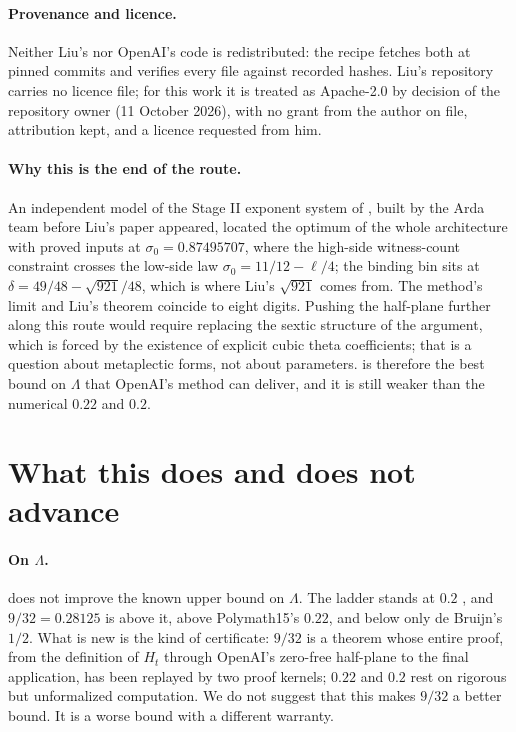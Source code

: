 \documentclass[11pt]{article}
\theoremstyle{definition}
\newcommand{\Lam}{\Lambda}
\newcommand{\Hfun}{H}
\begin{document}
\paragraph{Provenance and licence.} Neither Liu's nor OpenAI's code is redistributed: the recipe fetches both at pinned commits and verifies every file against recorded hashes. Liu's repository carries no licence file; for this work it is treated as Apache-2.0 by decision of the repository owner (11 October 2026), with no grant from the author on file, attribution kept, and a licence requested from him.

\paragraph{Why this is the end of the route.} An independent model of the Stage II exponent system of \cite{OAIqrh}, built by the Arda team before Liu's paper appeared, located the optimum of the whole architecture with proved inputs at $\sigma_0 = 0.87495707$, where the high-side witness-count constraint crosses the low-side law $\sigma_0 = 11/12 - \ell/4$; the binding bin sits at $\delta = 49/48 - \sqrt{921}/48$, which is where Liu's $\sqrt{921}$ comes from. The method's limit and Liu's theorem coincide to eight digits. Pushing the half-plane further along this route would require replacing the sextic structure of the argument, which is forced by the existence of explicit cubic theta coefficients; that is a question about metaplectic forms, not about parameters.  is therefore the best bound on $\Lam$ that OpenAI's method can deliver, and it is still weaker than the numerical $0.22$ and $0.2$.

\section{What this does and does not advance}\label{sec:frontier}

\paragraph{On $\Lam$.}  does not improve the known upper bound on $\Lam$. The ladder stands at $0.2$ \cite{PT}, and $9/32 = 0.28125$ is above it, above Polymath15's $0.22$, and below only de Bruijn's $1/2$. What is new is the kind of certificate: $9/32$ is a theorem whose entire proof, from the definition of $\Hfun_t$ through OpenAI's zero-free half-plane to the final application, has been replayed by two proof kernels; $0.22$ and $0.2$ rest on rigorous but unformalized computation. We do not suggest that this makes $9/32$ a better bound. It is a worse bound with a different warranty.
\end{document}
